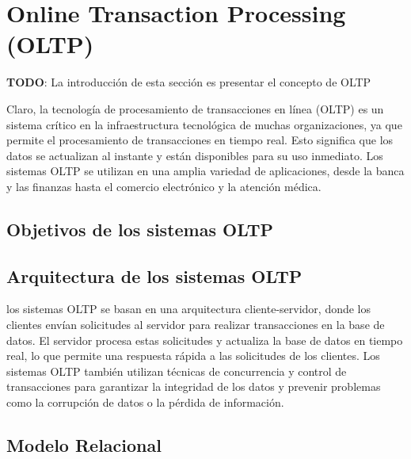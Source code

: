 \section{Online Transaction Processing (OLTP)} \label{section:oltp}

\textbf{TODO}: La introducci\'on de esta secci\'on es presentar el concepto de OLTP

Claro, la tecnología de procesamiento de transacciones en línea (OLTP) es un sistema crítico en 
la infraestructura tecnológica de muchas organizaciones, ya que permite el procesamiento de 
transacciones en tiempo real. Esto significa que los datos se actualizan al instante y están 
disponibles para su uso inmediato. Los sistemas OLTP se utilizan en una amplia variedad de 
aplicaciones, desde la banca y las finanzas hasta el comercio electrónico y la atención médica.

\subsection{Objetivos de los sistemas OLTP}
\subsection{Arquitectura de los sistemas OLTP}

los sistemas OLTP se basan en una arquitectura cliente-servidor, donde los clientes envían 
solicitudes al servidor para realizar transacciones en la base de datos. El servidor procesa 
estas solicitudes y actualiza la base de datos en tiempo real, lo que permite una respuesta 
rápida a las solicitudes de los clientes. Los sistemas OLTP también utilizan técnicas de 
concurrencia y control de transacciones para garantizar la integridad de los datos y prevenir 
problemas como la corrupción de datos o la pérdida de información.

\subsection{Modelo Relacional}